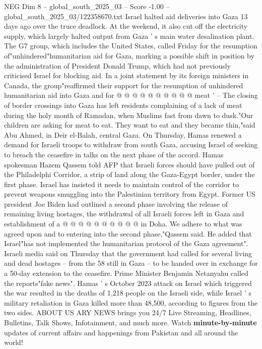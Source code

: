 \begin{textsample}{NEG Dim 8 – global\_south\_2025\_03 – Score -1.00 – global\_south\_2025\_03/122358670.txt}
Israel halted aid deliveries into Gaza 13 days ago over the truce deadlock.
At the weekend, it also cut off the electricity supply, which largely halted output from Gaza ' s main water desalination plant.
The G7 group, which includes the United States, called Friday for the resumption of"unhindered"humanitarian aid for Gaza, marking a possible shift in position by the administration of President Donald Trump, which had not previously criticised Israel for blocking aid.
In a joint statement by its foreign ministers in Canada, the group"reaffirmed their support for the resumption of unhindered humanitarian aid into Gaza and for @ @ @ @ @ @ @ @ @ @ meat ' -- The closing of border crossings into Gaza has left residents complaining of a lack of meat during the holy month of Ramadan, when Muslims fast from dawn to dusk."Our children are asking for meat to eat.
They want to eat and they became thin,"said Abu Ahmed, in Deir el-Balah, central Gaza.
On Thursday, Hamas renewed a demand for Israeli troops to withdraw from south Gaza, accusing Israel of seeking to breach the ceasefire in talks on the next phase of the accord.
Hamas spokesman Hazem Qassem told AFP that Israeli forces should have pulled out of the Philadelphi Corridor, a strip of land along the Gaza-Egypt border, under the first phase.
Israel has insisted it needs to maintain control of the corridor to prevent weapons smuggling into the Palestinian territory from Egypt.
Former US president Joe Biden had outlined a second phase involving the release of remaining living hostages, the withdrawal of all Israeli forces left in Gaza and establishment of a @ @ @ @ @ @ @ @ @ @ in Doha.
We adhere to what was agreed upon and to entering into the second phase,"Qassem said.
He added that Israel"has not implemented the humanitarian protocol of the Gaza agreement".
Israeli media said on Thursday that the government had called for several living and dead hostages -- from the 58 still in Gaza -- to be handed over in exchange for a 50-day extension to the ceasefire.
Prime Minister Benjamin Netanyahu called the reports"fake news".
Hamas ' s October 2023 attack on Israel which triggered the war resulted in the deaths of 1,218 people on the Israeli side, while Israel ' s military retaliation in Gaza killed more than 48,500, according to figures from the two sides.
ABOUT US ARY NEWS brings you 24/7 Live Streaming, Headlines, Bulletins, Talk Shows, Infotainment, and much more.
Watch \textbf{minute-by-minute} updates of current affairs and happenings from Pakistan and all around the world!

\end{textsample}
